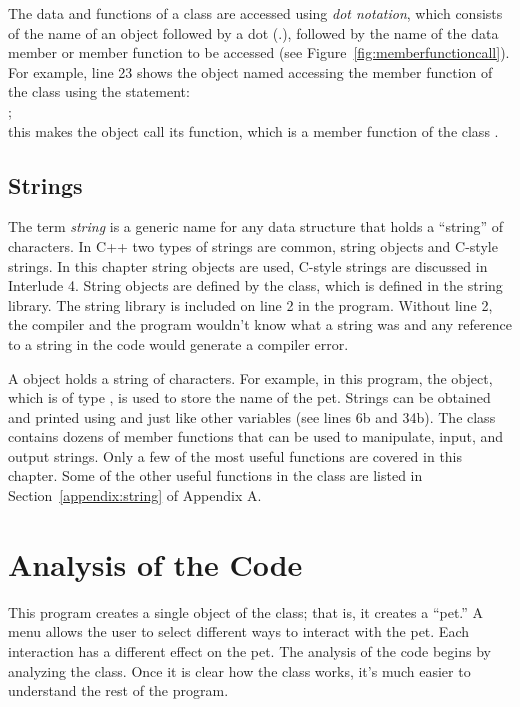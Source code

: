 The data and functions of a class are accessed using \emph{dot notation}, which consists of the name of an object followed by a dot (.), followed by the name of the data member or member function to be accessed (see Figure~\ref{fig:memberfunctioncall}).  For example, line 23 shows the object named  accessing the  member function of the  class using the statement:\\
;\\
this makes the  object call its  function, which is a member function of the class .

\subsection{Strings}

The term \emph{string} is a generic name for any data structure that holds a ``string'' of characters.  In C++ two types of strings are common, string objects and C-style strings.  In this chapter string objects are used, C-style strings are discussed in Interlude 4.   String objects are defined by the  class, which is defined in the string library.  The string library is included on line 2 in the program.  Without line 2, the compiler and the program wouldn't know what a string was and any reference to a string in the code would generate a compiler error.  

A  object holds a string of characters.  For example, in this program, the  object, which is of type , is used to store the name of the pet.  Strings can be obtained and printed using  and  just like other variables (see lines 6b and 34b).  The  class contains dozens of member functions that can be used to manipulate, input, and output strings.  Only a few of the most useful functions are covered in this chapter.  Some of the other useful functions in the  class are listed in Section~\ref{appendix:string} of Appendix A.

\section{Analysis  of the Code}

This program creates a single object of the  class; that is, it creates a ``pet.''  
A menu allows the user to select different ways to interact with the pet.  Each interaction has a different effect on the pet.  
The analysis of the code begins by analyzing the  class.  Once it is clear how the class works, it's much easier to understand the rest of the program.
  
